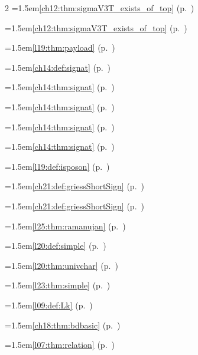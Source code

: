 \begin{multicols}{2}
\hangindent=1.5em\quad \ref{ch12:thm:sigmaV3T_exists_of_top} (p.~\pageref{ch12:thm:sigmaV3T_exists_of_top})\par
\hangindent=1.5em\quad \ref{ch12:thm:sigmaV3T_exists_of_top} (p.~\pageref{ch12:thm:sigmaV3T_exists_of_top})\par
\hangindent=1.5em\quad \ref{l19:thm:payload} (p.~\pageref{l19:thm:payload})\par
\hangindent=1.5em\quad \ref{ch14:def:signat} (p.~\pageref{ch14:def:signat})\par
\hangindent=1.5em\quad \ref{ch14:thm:signat} (p.~\pageref{ch14:thm:signat})\par
\hangindent=1.5em\quad \ref{ch14:thm:signat} (p.~\pageref{ch14:thm:signat})\par
\hangindent=1.5em\quad \ref{ch14:thm:signat} (p.~\pageref{ch14:thm:signat})\par
\hangindent=1.5em\quad \ref{ch14:thm:signat} (p.~\pageref{ch14:thm:signat})\par
\hangindent=1.5em\quad \ref{l19:def:isposon} (p.~\pageref{l19:def:isposon})\par
\hangindent=1.5em\quad \ref{ch21:def:griessShortSign} (p.~\pageref{ch21:def:griessShortSign})\par
\hangindent=1.5em\quad \ref{ch21:def:griessShortSign} (p.~\pageref{ch21:def:griessShortSign})\par
\hangindent=1.5em\quad \ref{l25:thm:ramanujan} (p.~\pageref{l25:thm:ramanujan})\par
\hangindent=1.5em\quad \ref{l20:def:simple} (p.~\pageref{l20:def:simple})\par
\hangindent=1.5em\quad \ref{l20:thm:univchar} (p.~\pageref{l20:thm:univchar})\par
\hangindent=1.5em\quad \ref{l23:thm:simple} (p.~\pageref{l23:thm:simple})\par
\hangindent=1.5em\quad \ref{l09:def:Lk} (p.~\pageref{l09:def:Lk})\par
\hangindent=1.5em\quad \ref{ch18:thm:bdbasic} (p.~\pageref{ch18:thm:bdbasic})\par
\hangindent=1.5em\quad \ref{l07:thm:relation} (p.~\pageref{l07:thm:relation})\par

\end{multicols}
